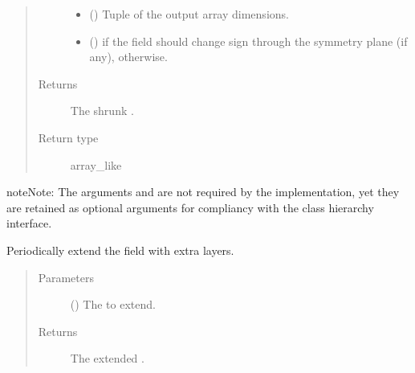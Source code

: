 \documentclass[letterpaper,10pt,english]{sphinxmanual}
\begin{document}
\begin{fulllineitems}
\begin{fulllineitems}
\begin{quote}
\begin{description}
\begin{itemize}
\item {} 
 () \textendash{} Tuple of the output array dimensions.

\item {} 
 () \textendash{}  if the field should change sign through the symmetry plane (if any),  otherwise.

\end{itemize}

\item[{Returns}] \leavevmode
The shrunk .

\item[{Return type}] \leavevmode
array\_like

\end{description}\end{quote}

\begin{sphinxadmonition}{note}{Note:}
The arguments  and  are not required by the implementation,
yet they are retained as optional arguments for compliancy with the class hierarchy interface.
\end{sphinxadmonition}

\end{fulllineitems}


\begin{fulllineitems}
\label{\detokenize{api:dycore.horizontal_boundary.Periodic.from_physical_to_computational_domain}}
Periodically extend the field  with  extra layers.
\begin{quote}\begin{description}
\item[{Parameters}] \leavevmode
{} () \textendash{} The  to extend.

\item[{Returns}] \leavevmode
The extended .


\end{description}
\end{quote}
\end{fulllineitems}
\end{fulllineitems}
\end{document}
